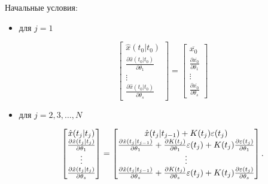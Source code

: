 \documentclass[a4paper,14pt]{extarticle}
\begin{document}
Начальные условия:
\begin{itemize}

\item для $j = 1$

\begin{equation}
\label{eq:senstateinitcond1}
\begin{bmatrix}
	\hat{x}(t_0|t_0) \\
	\frac{\partial \hat{x}(t_0|t_0)}{\partial \theta_1} \\
	\vdots \\
	\frac{\partial \hat{x}(t_0|t_0)}{\partial \theta_s}
\end{bmatrix} =
\begin{bmatrix}
	\overline{x_0} \\
	\frac{\partial \overline{x_0}}{\partial \theta_1} \\
	\vdots \\
	\frac{\partial \overline{x_0}}{\partial \theta_s}
\end{bmatrix}
\end{equation}

\item для $j = 2, 3, \ldots, N$

\begin{equation}
\label{eq:senstateinitcondj}
\begin{bmatrix}
	\hat{x}(t_j|t_j) \\
	\frac{\partial \hat{x}(t_j|t_j)}{\partial \theta_1} \\
	\vdots \\
	\frac{\partial \hat{x}(t_j|t_j)}{\partial \theta_s}
\end{bmatrix} =
\begin{bmatrix}
	\hat{x}(t_j|t_{j-1}) + K(t_j) \varepsilon(t_j) \\
	\frac{\partial \hat{x}(t_j|t_{j-1})}{\partial \theta_1} + 
	\frac{\partial K(t_j)}
		{\partial \theta_1} \varepsilon(t_j) + K(t_j) \frac{\partial \varepsilon(t_j)}
		{\partial \theta_1} \\
		\vdots \\
	\frac{\partial \hat{x}(t_j|t_{j-1})}{\partial \theta_s} + 
	\frac{\partial K(t_j)}
		{\partial \theta_s} \varepsilon(t_j) + K(t_j) \frac{\partial \varepsilon(t_j)}
		{\partial \theta_s}
\end{bmatrix}.
\end{equation}

\end{itemize}
\end{document}
